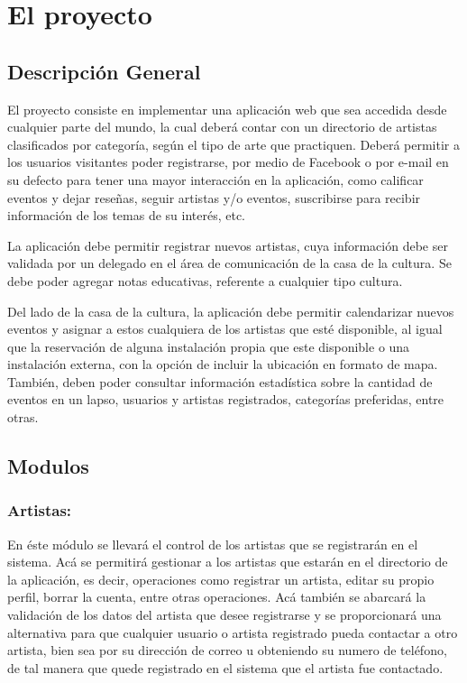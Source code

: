 \documentclass[letterpaper,11pt,spanish]{sphinxmanual}
\begin{document}
\chapter{El proyecto}
\label{proyecto::doc}\label{proyecto:el-proyecto}

\section{Descripción General}
\label{proyecto:descripcion-general}
El proyecto consiste en implementar una aplicación web que sea accedida desde
cualquier parte del mundo, la cual deberá contar con un directorio de artistas
clasificados por categoría, según el tipo de arte que practiquen. Deberá permitir
a los usuarios visitantes poder registrarse, por medio de Facebook o por
e-mail en su defecto para tener una mayor interacción en la aplicación, como
calificar eventos y dejar reseñas, seguir artistas y/o eventos, suscribirse
para recibir información de los temas de su interés, etc.

La aplicación debe permitir registrar nuevos artistas, cuya información debe ser
validada por un delegado en el área de comunicación de la casa de la cultura.
Se debe poder agregar notas educativas, referente a cualquier tipo cultura.

Del lado de la casa de la cultura, la aplicación debe permitir calendarizar nuevos
eventos y asignar a estos cualquiera de los artistas que esté disponible, al igual
que la reservación de alguna instalación propia que este disponible o una instalación
externa, con la opción de incluir la ubicación en formato de mapa. También, deben
poder consultar información estadística sobre la cantidad de eventos en un lapso,
usuarios y artistas registrados, categorías preferidas, entre otras.


\section{Modulos}
\label{proyecto:modulos}

\subsection{Artistas:}
\label{proyecto:artistas}
En éste módulo se llevará el control de los artistas que se registrarán en el
sistema. Acá se permitirá gestionar a los artistas que estarán en el directorio
de la aplicación, es decir, operaciones como registrar un artista, editar su propio
perfil, borrar la cuenta, entre otras operaciones. Acá también se abarcará la
validación de los datos del artista que desee registrarse y se proporcionará una
alternativa para que cualquier usuario o artista registrado pueda contactar a otro artista,
bien sea por su dirección de correo u obteniendo su numero de teléfono, de tal manera
que quede registrado en el sistema que el artista fue contactado.
\end{document}
